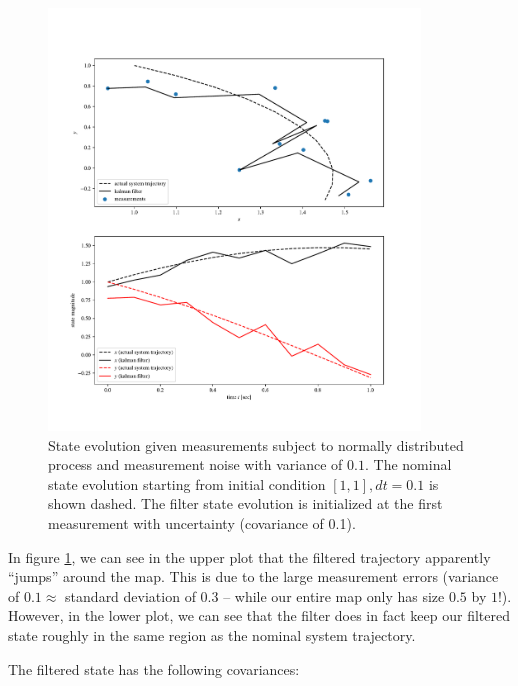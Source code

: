 \begin{figure}[h]
    \centering
    \includegraphics[width=0.88\textwidth]{q2_4.pdf}
    \vspace{-5mm}
    \caption{State evolution given measurements subject to normally distributed process and measurement noise with variance of $0.1$. 
    The nominal state evolution starting from initial condition $[1,1], dt=0.1$ is shown dashed. The filter state evolution is initialized at the first measurement with uncertainty (covariance of 0.1).}
    \label{fig:kalman}
\end{figure}
\clearpage
In figure \ref{fig:kalman}, we can see in the upper plot that the filtered trajectory apparently ``jumps'' around the map. 
This is due to the large measurement errors (variance of $0.1 \approx$ standard deviation of $0.3$ -- while our entire map only has size $0.5$ by $1$!). 
However, in the lower plot, we can see that the filter does in fact keep our filtered state roughly in the same region as the nominal system trajectory. 

The filtered state has the following covariances:


